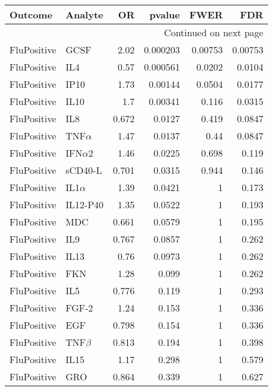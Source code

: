 \documentclass[10pt]{article}
\begin{document}
\begin{longtable}{llrrrr}
\toprule
     Outcome &       Analyte &    OR &   pvalue &    FWER &     FDR \\
\midrule
\endhead
\midrule
\multicolumn{6}{r}{{Continued on next page}} \\
\midrule
\endfoot

\bottomrule
\endlastfoot
 FluPositive &          GCSF &  2.02 & 0.000203 & 0.00753 & 0.00753 \\
 FluPositive &           IL4 &  0.57 & 0.000561 &  0.0202 &  0.0104 \\
 FluPositive &          IP10 &  1.73 &  0.00144 &  0.0504 &  0.0177 \\
 FluPositive &          IL10 &   1.7 &  0.00341 &   0.116 &  0.0315 \\
 FluPositive &           IL8 & 0.672 &   0.0127 &   0.419 &  0.0847 \\
 FluPositive &   TNF$\alpha$ &  1.47 &   0.0137 &    0.44 &  0.0847 \\
 FluPositive &  IFN$\alpha$2 &  1.46 &   0.0225 &   0.698 &   0.119 \\
 FluPositive &       sCD40-L & 0.701 &   0.0315 &   0.944 &   0.146 \\
 FluPositive &   IL1$\alpha$ &  1.39 &   0.0421 &       1 &   0.173 \\
 FluPositive &      IL12-P40 &  1.35 &   0.0522 &       1 &   0.193 \\
 FluPositive &           MDC & 0.661 &   0.0579 &       1 &   0.195 \\
 FluPositive &           IL9 & 0.767 &   0.0857 &       1 &   0.262 \\
 FluPositive &          IL13 &  0.76 &   0.0973 &       1 &   0.262 \\
 FluPositive &           FKN &  1.28 &    0.099 &       1 &   0.262 \\
 FluPositive &           IL5 & 0.776 &    0.119 &       1 &   0.293 \\
 FluPositive &         FGF-2 &  1.24 &    0.153 &       1 &   0.336 \\
 FluPositive &           EGF & 0.798 &    0.154 &       1 &   0.336 \\
 FluPositive &    TNF$\beta$ & 0.813 &    0.194 &       1 &   0.398 \\
 FluPositive &          IL15 &  1.17 &    0.298 &       1 &   0.579 \\
 FluPositive &           GRO & 0.864 &    0.339 &       1 &   0.627 \\

\end{longtable}
\end{document}
